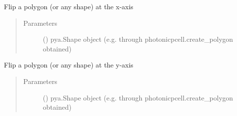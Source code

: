 \documentclass[a4paper,10pt,english]{sphinxmanual}
\begin{document}
\begin{fulllineitems}
\begin{fulllineitems}
\begin{quote}
\begin{description}
\end{description}\end{quote}

\end{fulllineitems}


\begin{fulllineitems}
\label{\detokenize{photonics:kppc.photonics.PhotDevice.flip_shape_xaxis}}
Flip a polygon (or any shape) at the x-axis
\begin{quote}\begin{description}
\item[{Parameters}] \leavevmode
{} () \textendash{} pya.Shape object (e.g. through photonicpcell.create\_polygon obtained)

\end{description}\end{quote}

\end{fulllineitems}


\begin{fulllineitems}
\label{\detokenize{photonics:kppc.photonics.PhotDevice.flip_shape_yaxis}}
Flip a polygon (or any shape) at the y-axis
\begin{quote}\begin{description}
\item[{Parameters}] \leavevmode
{} () \textendash{} pya.Shape object (e.g. through photonicpcell.create\_polygon obtained)

\end{description}\end{quote}

\end{fulllineitems}



\end{fulllineitems}
\end{document}
